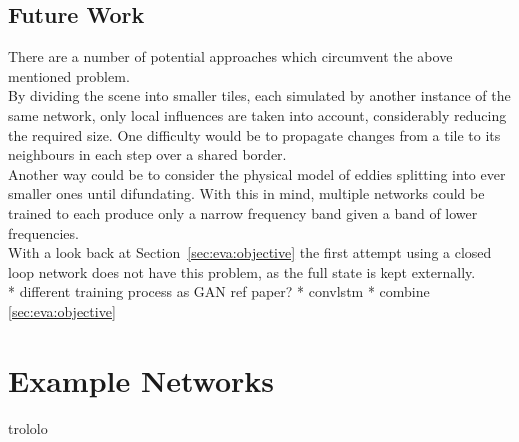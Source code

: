\documentclass[sigconf]{acmart}
\begin{document}
\subsection{Future Work}
There are a number of potential approaches which circumvent the above mentioned problem. \\
By dividing the scene into smaller tiles, each simulated by another instance of the same network, only local influences are taken into account, considerably reducing the required size. One difficulty would be to propagate changes from a tile to its neighbours in each step over a shared border.\\
Another way could be to consider the physical model of eddies splitting into ever smaller ones until difundating.
With this in mind, multiple networks could be trained to each produce only a narrow frequency band given a band of lower frequencies. \\
With a look back at Section~\ref{sec:eva:objective} the first attempt using a closed loop network does not have this problem, as the full state is kept externally. \\
* different training process as GAN ref paper?
* convlstm
* combine \ref{sec:eva:objective}


%


\appendix
\section{Example Networks}
trololo
\end{document}
